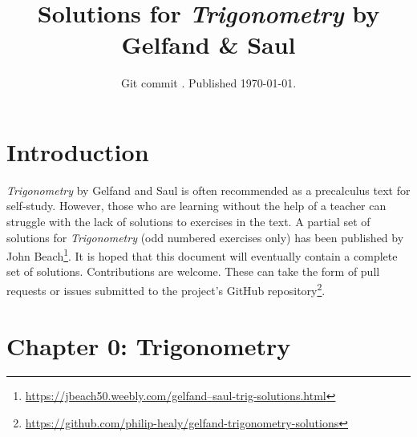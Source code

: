 \documentclass{article}
\title{Solutions for \textit{Trigonometry} by Gelfand \& Saul}
\author{}
\date{Git commit \texttt{\abbrevcommit}. Published \today.}
\newenvironment{solutions}[1]
{\subsection*{#1}
 \begin{enumerate}[leftmargin=1.5em]}
{\end{enumerate}}
\newcommand{\solution}{\item}
\begin{document}
\maketitle

\section*{Introduction}
\textit{Trigonometry} by Gelfand and Saul is often recommended as a precalculus text for self-study.
However, those who are learning without the help of a teacher can struggle with the lack of solutions to exercises in the text.
A partial set of solutions for \textit{Trigonometry} (odd numbered exercises only) has been published by John Beach\footnote{\href{https://jbeach50.weebly.com/gelfand--saul-trig-solutions.html}{https://jbeach50.weebly.com/gelfand--saul-trig-solutions.html}}.
It is hoped that this document will eventually contain a complete set of solutions.
Contributions are welcome. These can take the form of pull requests or issues submitted to the project's GitHub repository\footnote{\href{https://github.com/philip-healy/gelfand-trigonometry-solutions}{https://github.com/philip-healy/gelfand-trigonometry-solutions}}.

\section*{Chapter 0: Trigonometry}

\begin{comment}
\begin{solutions}{Page 3}
\solution
\solution
\solution
\end{solutions}

\begin{solutions}{Page 5}
\solution
\solution
\end{solutions}
\end{comment}
\end{document}
